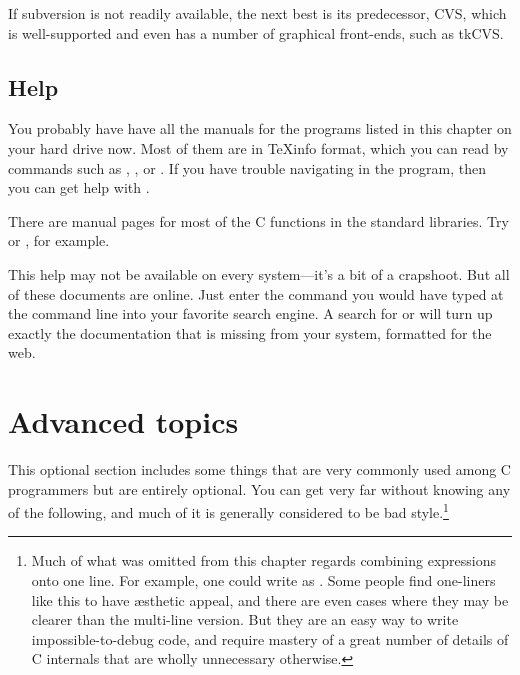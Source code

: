 \documentclass[12pt]{article}
\begin{document}
If subversion is not readily available, the next best is its predecessor,
CVS, which is well-supported and even has a number of graphical
front-ends, such as tkCVS.  

\subsection{Help} 
You probably have have all the manuals for the programs listed in this
chapter on your hard drive now. Most of them are in \TeX info format,
which you can read by commands such as , ,
or . If you have trouble navigating in the 
program, then you can get help with .

There are manual pages for most of the C functions in the standard libraries. Try
 or , for example.

This help may not be available on every system---it's a bit of
a crapshoot. But all of these documents are online. Just enter the
command you would have typed at the command line into your favorite
search engine. A search for  or  will
turn up exactly the documentation that is missing from your system,
formatted for the web.

\section{Advanced topics}
This optional section includes some things that are very commonly used among
C programmers but are entirely optional. You can get very far without
knowing any of the following, and much of it is generally considered to
be bad style.\footnote{Much of what was omitted from this chapter
regards combining expressions onto one line. For example, 
one could write  as 
. Some people find one-liners like
this to have \ae{}sthetic appeal, and there are even cases where they
may be clearer than the multi-line version. But they are an
easy way to write impossible-to-debug code, and require mastery of
a great number of details of C internals that are wholly unnecessary
otherwise.}
\end{document}
